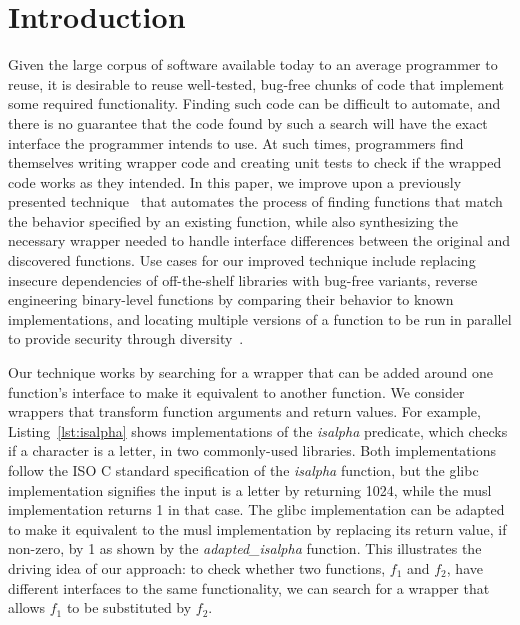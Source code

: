 \section{Introduction}
%
Given the large corpus of software available today to an average programmer
to reuse, it is desirable to reuse well-tested, bug-free chunks of
code that implement some required functionality.
%
Finding such code can be difficult to automate, and there is no
guarantee that the code found by such a search will have the exact
interface the programmer intends to use. 
%
At such times, programmers find themselves writing wrapper code and
creating unit tests to check if the wrapped code works as they intended.
%
In this paper, we improve upon a previously presented technique~\cite{icst-adaptersynth} that automates the process of
finding functions that match the behavior specified by an existing
function, while also synthesizing the necessary wrapper needed to handle 
interface differences between the original and discovered functions.
%
Use cases for our improved technique include replacing insecure dependencies of off-the-shelf libraries with bug-free variants, reverse engineering binary-level functions by comparing their behavior to known implementations, and locating multiple versions of a function to be run in parallel to provide security through diversity~\cite{BorckBDHHJSS2016}.

Our technique works by searching for a wrapper that can be added around one function's interface to make it equivalent to another function.
%
We consider wrappers that transform function arguments and return values.
%
For example, Listing~\ref{lst:isalpha} shows implementations of the \textit{isalpha} predicate, which checks if a character is a letter, in two commonly-used libraries.
%
Both implementations follow the ISO C standard specification of the \textit{isalpha} function, but the glibc implementation signifies the input is a letter by returning 1024, while the musl implementation returns 1 in that case.
%
The glibc implementation can be adapted to make it equivalent to the musl implementation by replacing its return value, if non-zero, by 1 as shown by the \textit{adapted\_isalpha} function.
%
This illustrates the driving idea of our approach: to check whether two functions, $f_1$ and $f_2$, have different interfaces to the same functionality, we can search for a wrapper that allows $f_1$ to be substituted by $f_2$.

